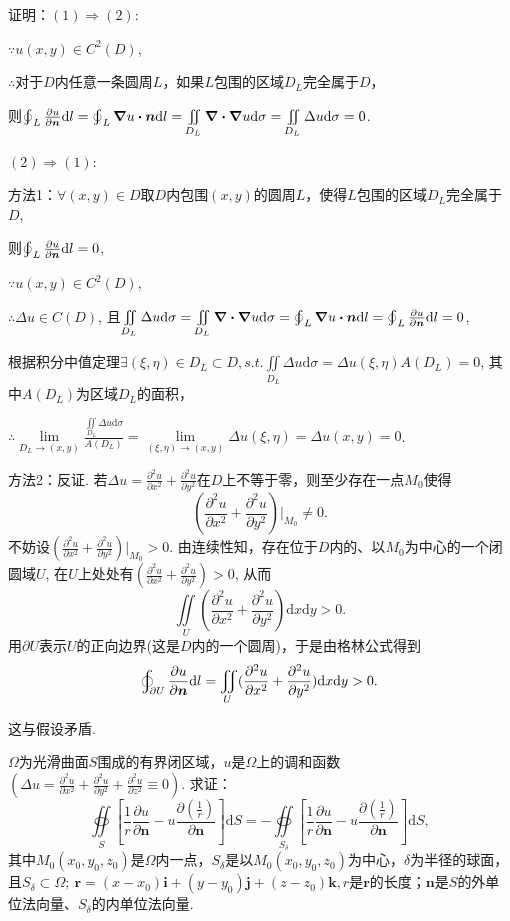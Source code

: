 \documentclass[12pt,UTF8]{ctexart}
\newcommand{\IInt}[3]{\iint\limits_{#1}#2\mathrm d#3}
\newcommand{\varIInt}[4]{\iint\limits_{#1}#2\mathrm d#3\mathrm d#4}
\newcommand{\BLOInt}[2]{\varoint\nolimits_{#1}#2}
\newcommand{\md}[1]{\mathrm d#1}
\newcommand{\pp}[2]{\frac{\partial #1}{\partial #2}}
\newcommand{\BSOIInt}[2]{\oiint\limits_{#1}#2}
\begin{document}
\begin{enumerate}
证明：$(1)\Rightarrow(2)$:

$\because u(x,y)\in C^2(D)$,

$\therefore$对于$D$内任意一条圆周$L$，如果$L$包围的区域$D_L$完全属于$D$，

则$\BLOInt L{\pp u{\bm n}\md l}=\BLOInt L{\bm\nabla u\bm\cdot\bm n\md l}=\IInt{D_L}{\bm\nabla\bm\cdot\bm\nabla u}\sigma=\IInt{D_L}{\Delta u}\sigma=0$.

$(2)\Rightarrow(1)$:

方法1：$\forall(x,y)\in D$取$D$内包围$(x,y)$的圆周$L$，使得$L$包围的区域$D_L$完全属于$D$,

则$\BLOInt L{\pp u{\bm n}\md l}=0$,

$\because u(x,y)\in C^2(D)$,

$\therefore\Delta u\in C(D)$, 且$\IInt{D_L}{\Delta u}\sigma=\IInt{D_L}{\bm\nabla\bm\cdot\bm\nabla u}\sigma=\BLOInt L{\bm\nabla u\bm\cdot\bm n\md l}=\BLOInt L{\pp u{\bm n}\md l}=0$,

根据积分中值定理$\exists(\xi,\eta)\in D_L\subset D,s.t.\IInt{D_L}{\Delta u}\sigma=\Delta u(\xi,\eta)A(D_L)=0$, 其中$A(D_L)$为区域$D_L$的面积，

$\therefore\lim\limits_{D_L\rightarrow(x,y)}\frac{\IInt{D_L}{\Delta u}\sigma}{A(D_L)}=\lim\limits_{(\xi,\eta)\rightarrow(x,y)}\Delta u(\xi,\eta)=\Delta u(x,y)=0$.

方法2：反证. 若$\Delta u=\frac{\partial^2u}{\partial x^2}+\frac{\partial^2u}{\partial y^2}$在$D$上不等于零，则至少存在一点$M_0$使得
\[(\frac{\partial^2u}{\partial x^2}+\frac{\partial^2u}{\partial y^2})\Big|_{M_0}\neq0.\]
不妨设$(\frac{\partial^2u}{\partial x^2}+\frac{\partial^2u}{\partial y^2})\Big|_{M_0}>0$. 由连续性知，存在位于$D$内的、以$M_0$为中心的一个闭圆域$U$, 在$U$上处处有$(\frac{\partial^2u}{\partial x^2}+\frac{\partial^2u}{\partial y^2})>0$, 从而
\[\varIInt U{(\frac{\partial^2u}{\partial x^2}+\frac{\partial^2u}{\partial y^2})}xy>0.\]
用$\partial U$表示$U$的正向边界(这是$D$内的一个圆周)，于是由格林公式得到
\[\BLOInt{\partial U}{\pp u{\bm n}\md l}=\varIInt U{(\frac{\partial^2u}{\partial x^2}+\frac{\partial^2u}{\partial y^2})}xy>0.\]

这与假设矛盾.

$\Omega$为光滑曲面$S$围成的有界闭区域，$u$是$\Omega$上的调和函数$(\Delta u=\frac{\partial^2u}{\partial x^2}+\frac{\partial^2u}{\partial y^2}+\frac{\partial^2u}{\partial z^2}\equiv0)$. 求证：
\[\BSOIInt S{[\frac1r\pp u{\bm n}-u\pp{(\frac1r)}{\bm n}]\md S}=-\BSOIInt{S_\delta}{[\frac1r\pp u{\bm n}-u\pp{(\frac1r)}{\bm n}]\md S},\]
其中$M_0(x_0,y_0,z_0)$是$\Omega$内一点，$S_\delta$是以$M_0(x_0,y_0,z_0)$为中心，$\delta$为半径的球面，且$S_\delta\subset\Omega;\ \bm r=(x-x_0)\bm i+(y-y_0)\bm j+(z-z_0)\bm k, r$是$\bm r$的长度；$\bm n$是$S$的外单位法向量、$S_\delta$的内单位法向量.


\end{enumerate}
\end{document}
